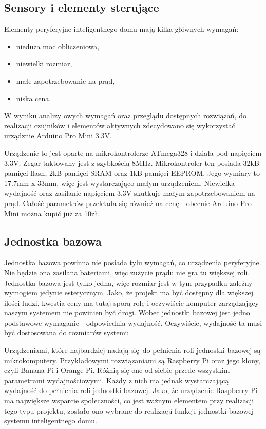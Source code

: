 \documentclass[eng,oneside]{mgr}
\begin{document}
\subsection{Sensory i elementy sterujące} %
\label{sub:sensory_i_elementy_sterujace}
Elementy peryferyjne inteligentnego domu mają kilka głównych wymagań:
\begin{itemize}
	\item nieduża moc obliczeniowa,
	\item niewielki rozmiar,
	\item małe zapotrzebowanie na prąd,
	\item niska cena.
\end{itemize}
W wyniku analizy owych wymagań oraz przeglądu dostępnych rozwiązań, do realizacji czujników i elementów aktywnych zdecydowano się wykorzystać urządznie Arduino Pro Mini 3.3V.

Urządzenie to jest oparte na mikrokontrolerze ATmega328 i działa pod napięciem 3.3V. Zegar taktowany jest z szybkością 8MHz. Mikrokontroler ten posiada 32kB pamięci flash, 2kB pamięci SRAM oraz 1kB pamięci EEPROM. Jego wymiary to 17.7mm x 33mm, więc jest wystarczająco małym urządzeniem. Niewielka wydajność oraz zasilanie napięciem 3.3V skutkuje małym zapotrzebowaniem na prąd. Całość parametrów przekłada się również na cenę - obecnie Arduino Pro Mini można kupić już za 10zł.

\subsection{Jednostka bazowa} %
\label{sub:jednostka_bazowa}
Jednostka bazowa powinna nie posiada tylu wymagań, co urządzenia peryferyjne. Nie będzie ona zasilana bateriami, więc zużycie prądu nie gra tu większej roli. Jednostka bazowa jest tylko jedna, więc  rozmiar jest w tym przypadku zależny wymogiem jedynie estetycznym. Jako, że projekt ma być dostępny dla większej ilości ludzi, kwestia ceny ma tutaj sporą rolę i oczywiście komputer zarządzający naszym systemem nie powinien być drogi. Wobec jednostki bazowej jest jedno podstawowe wymaganie - odpowiednia wydajność. Oczywiście, wydajność ta musi być dostosowana do rozmiarów systemu.

Urządzeniami, które najbardziej nadają się do pełnienia roli jednostki bazowej są mikrokomputery. Przykładowymi rozwiązaniami są Raspberry Pi oraz jego klony, czyli Banana Pi i Orange Pi. Różnią się one od siebie przede wszystkim parametrami wydajnościowymi. Każdy z nich ma jednak wystarczającą wydajność do pełnienia roli jednostki bazowej. Jako, że urządzenie Raspberry Pi ma największe wsparcie społeczności, co jest ważnym elementem przy realizacji tego typu projektu, zostało ono wybrane do realizacji funkcji jednostki bazowej systemu inteligentnego domu.
\end{document}
